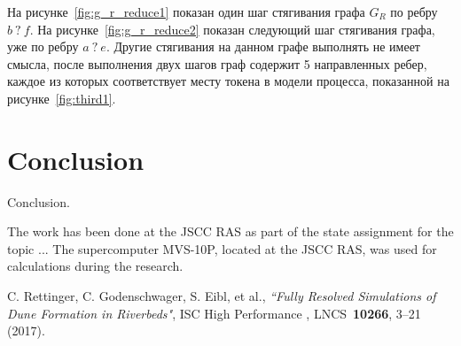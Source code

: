 \documentclass[
11pt,%
tightenlines,%
twoside,%
onecolumn,%
nofloats,%
nobibnotes,%
nofootinbib,%
superscriptaddress,%
noshowpacs,%
centertags]%
{revtex4}
\begin{document}
На рисунке~\ref{fig:g_r_reduce1} показан один шаг стягивания графа $G_R$ по ребру $b \ ? \ f$.
На рисунке~\ref{fig:g_r_reduce2} показан следующий шаг стягивания графа, уже по ребру $a \ ? \ e$.
Другие стягивания на данном графе выполнять не имеет смысла, после выполнения двух шагов граф содержит 5 направленных ребер, каждое из которых соответствует месту токена в модели процесса, показанной на рисунке~\ref{fig:third1}.

\section{Conclusion}

Conclusion.

\begin{acknowledgments}
The work has been done at the JSCC RAS as part of the state assignment for the topic ... The supercomputer MVS-10P, located at the JSCC RAS, was used for calculations during the research.
\end{acknowledgments}

\begin{thebibliography}{99}

C. Rettinger, C. Godenschwager, S. Eibl, et al., {\it ``Fully Resolved Simulations of Dune Formation in Riverbeds"}, ISC High Performance , LNCS~{\bf 10266}, 3--21 (2017).

\end{thebibliography}
\end{document}
